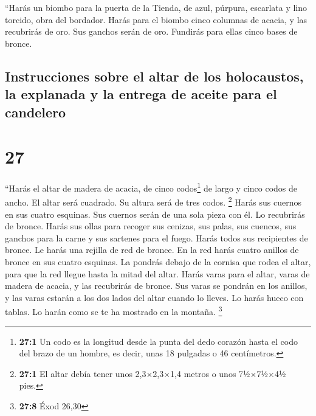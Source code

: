  ``Harás un biombo para la puerta de la Tienda, de azul,
púrpura, escarlata y lino torcido, obra del bordador. 
Harás para el biombo cinco columnas de acacia, y las recubrirás de oro.
Sus ganchos serán de oro. Fundirás para ellas cinco bases de bronce.

\hypertarget{instrucciones-sobre-el-altar-de-los-holocaustos-la-explanada-y-la-entrega-de-aceite-para-el-candelero}{%
\subsection{Instrucciones sobre el altar de los holocaustos, la
explanada y la entrega de aceite para el
candelero}\label{instrucciones-sobre-el-altar-de-los-holocaustos-la-explanada-y-la-entrega-de-aceite-para-el-candelero}}

\hypertarget{section-26}{%
\section{27}\label{section-26}}

 ``Harás el altar de madera de acacia, de cinco
codos\footnote{\textbf{27:1} Un codo es la longitud desde la punta del
  dedo corazón hasta el codo del brazo de un hombre, es decir, unas 18
  pulgadas o 46 centímetros.} de largo y cinco codos de ancho. El altar
será cuadrado. Su altura será de tres codos. \footnote{\textbf{27:1} El
  altar debía tener unos 2,3×2,3×1,4 metros o unos 7½×7½×4½ pies.}
 Harás sus cuernos en sus cuatro esquinas. Sus cuernos
serán de una sola pieza con él. Lo recubrirás de bronce. 
Harás sus ollas para recoger sus cenizas, sus palas, sus cuencos, sus
ganchos para la carne y sus sartenes para el fuego. Harás todos sus
recipientes de bronce.  Le harás una rejilla de red de
bronce. En la red harás cuatro anillos de bronce en sus cuatro esquinas.
 La pondrás debajo de la cornisa que rodea el altar, para
que la red llegue hasta la mitad del altar.  Harás varas
para el altar, varas de madera de acacia, y las recubrirás de bronce.
 Sus varas se pondrán en los anillos, y las varas estarán
a los dos lados del altar cuando lo lleves.  Lo harás
hueco con tablas. Lo harán como se te ha mostrado en la montaña.
\footnote{\textbf{27:8} Éxod 26,30}

